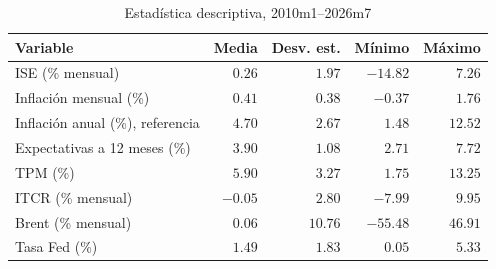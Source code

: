 \begin{table}[H]
\centering
\caption{Estadística descriptiva, 2010m1--2026m7}
\label{tab:descriptivos}
\small
\begin{tabular}{@{}lrrrr@{}}
\toprule
Variable & Media & Desv. est. & Mínimo & Máximo \\
\midrule
ISE (\% mensual) & $0.26$ & $1.97$ & $-14.82$ & $7.26$ \\
Inflación mensual (\%) & $0.41$ & $0.38$ & $-0.37$ & $1.76$ \\
Inflación anual (\%), referencia & $4.70$ & $2.67$ & $1.48$ & $12.52$ \\
Expectativas a 12 meses (\%) & $3.90$ & $1.08$ & $2.71$ & $7.72$ \\
TPM (\%) & $5.90$ & $3.27$ & $1.75$ & $13.25$ \\
ITCR (\% mensual) & $-0.05$ & $2.80$ & $-7.99$ & $9.95$ \\
Brent (\% mensual) & $0.06$ & $10.76$ & $-55.48$ & $46.91$ \\
Tasa Fed (\%) & $1.49$ & $1.83$ & $0.05$ & $5.33$ \\
\bottomrule
\end{tabular}
\end{table}
